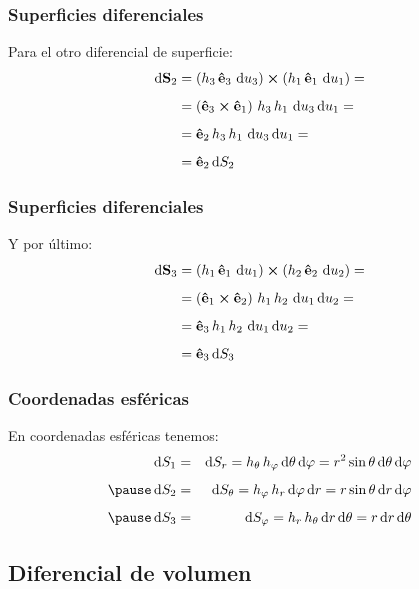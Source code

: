 \documentclass[12pt]{beamer}
\begin{document}
\begin{frame}
\frametitle{Superficies diferenciales}
Para el otro diferencial de superficie:
\pause
\begin{eqnarray*}
\begin{aligned}
\dd{\vb{S}_{2}} &= \left( h_{3} \, \vu{e}_{3} \, \dd{u}_{3} \right) \cp \left( h_{1} \, \vu{e}_{1} \, \dd{u}_{1} \right) = \\[0.5em]
&= \left( \vu{e}_{3} \cp \vu{e}_{1} \right) \, h_{3} \, h_{1} \, \dd{u_{3}} \dd{u_{1}} = \\[0.5em]
&= \vu{e}_{2} \, h_{3} \, h_{1} \, \dd{u_{3}} \dd{u_{1}} = \\[0.5em]
&= \vu{e}_{2} \dd{S_{2}}
\end{aligned}
\end{eqnarray*}
\end{frame}
\begin{frame}
\frametitle{Superficies diferenciales}
Y por último:
\begin{eqnarray*}
\begin{aligned}    
\dd{\vb{S}_{3}} &= \left( h_{1} \, \vu{e}_{1} \, \dd{u}_{1} \right) \cp \left( h_{2} \, \vu{e}_{2} \, \dd{u}_{2} \right) = \\[0.5em]
&= \left( \vu{e}_{1} \cp \vu{e}_{2} \right) \, h_{1} \, h_{2} \, \dd{u_{1}} \dd{u_{2}} = \\[0.5em]
&= \vu{e}_{3} \, h_{1} \, h_{2} \, \dd{u_{1}} \dd{u_{2}} = \\[0.5em]
&= \vu{e}_{3} \dd{S_{3}}
\end{aligned}
\end{eqnarray*}
\end{frame}
\begin{frame}
\frametitle{Coordenadas esféricas}
En coordenadas esféricas tenemos:
\pause
\begin{eqnarray*}
\dd{S_{1}} &=& \dd{S_{r}} = h_{\theta} \, h_{\varphi} \dd{\theta} \dd{\varphi} = r^{2} \sin \theta \dd{\theta} \dd{\varphi} \\[0.5em] \pause
\dd{S_{2}} &=& \dd{S_{\theta}} = h_{\varphi} \, h_{r} \dd{\varphi} \dd{r} = r \sin \theta \dd{r} \dd{\varphi} \\[0.5em] \pause
\dd{S_{3}} &=& \dd{S_{\varphi}} = h_{r} \, h_{\theta} \dd{r} \dd{\theta} = r \dd{r} \dd{\theta}
\end{eqnarray*}
\end{frame}

\subsection{Diferencial de volumen}
\end{document}
